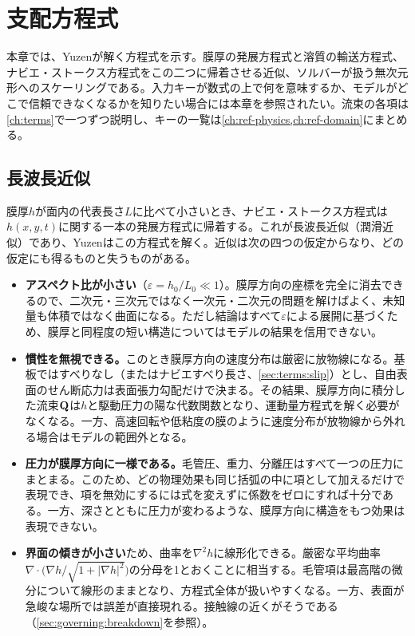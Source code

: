 \chapter{支配方程式}
\label{ch:governing}

本章では、Yuzenが解く方程式を示す。膜厚の発展方程式と溶質の輸送方程式、ナビエ・ストークス方程式をこの二つに帰着させる近似、ソルバーが扱う無次元形へのスケーリングである。入力キーが数式の上で何を意味するか、モデルがどこで信頼できなくなるかを知りたい場合には本章を参照されたい。流束の各項は\cref{ch:terms}で一つずつ説明し、キーの一覧は\cref{ch:ref-physics,ch:ref-domain}にまとめる。

\section{長波長近似}
\label{sec:governing:longwave}

膜厚$h$が面内の代表長さ$L$に比べて小さいとき、ナビエ・ストークス方程式は$h(x,y,t)$に関する一本の発展方程式に帰着する。これが長波長近似（潤滑近似）であり、Yuzenはこの方程式を解く。近似は次の四つの仮定からなり、どの仮定にも得るものと失うものがある。

\begin{itemize}
  \item \textbf{アスペクト比が小さい}（$\varepsilon = h_0/L_0 \ll 1$）。膜厚方向の座標を完全に消去できるので、二次元・三次元ではなく一次元・二次元の問題を解けばよく、未知量も体積ではなく曲面になる。ただし結論はすべて$\varepsilon$による展開に基づくため、膜厚と同程度の短い構造についてはモデルの結果を信用できない。
  \item \textbf{慣性を無視できる。}このとき膜厚方向の速度分布は厳密に放物線になる。基板ではすべりなし（またはナビエすべり長さ、\cref{sec:terms:slip}）とし、自由表面のせん断応力は表面張力勾配だけで決まる。その結果、膜厚方向に積分した流束$\mathbf{Q}$は$h$と駆動圧力の陽な代数関数となり、運動量方程式を解く必要がなくなる。一方、高速回転や低粘度の膜のように速度分布が放物線から外れる場合はモデルの範囲外となる。
  \item \textbf{圧力が膜厚方向に一様である。}毛管圧、重力、分離圧はすべて一つの圧力にまとまる。このため、どの物理効果も同じ括弧の中に項として加えるだけで表現でき、項を無効にするには式を変えずに係数をゼロにすれば十分である。一方、深さとともに圧力が変わるような、膜厚方向に構造をもつ効果は表現できない。
  \item \textbf{界面の傾きが小さい}ため、曲率を$\nabla^2 h$に線形化できる。厳密な平均曲率$\nabla\cdot\bigl(\nabla h/\sqrt{1+|\nabla h|^2}\bigr)$の分母を1とおくことに相当する。毛管項は最高階の微分について線形のままとなり、方程式全体が扱いやすくなる。一方、表面が急峻な場所では誤差が直接現れる。接触線の近くがそうである（\cref{sec:governing:breakdown}を参照）。
\end{itemize}

